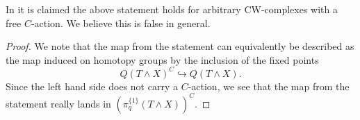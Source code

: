 \begin{rem}
In \cite[\pno~22]{hmmixed} it is claimed the above statement
holds for arbitrary CW-complexes with a free $C$-action. We
believe this is false in general.
\end{rem}
\begin{proof}
We note that the map from the statement can equivalently be described
as the map induced on homotopy groups by the inclusion of the
fixed points
\[
Q(T\wedge X)^C\hookrightarrow Q(T\wedge X).
\]
Since the left hand side does not carry a $C$-action, we see
that the map from the statement really lands in
$\left(\pi_q^{\{1\}}(  T\wedge X)\right)^C$.
%

\end{proof}

